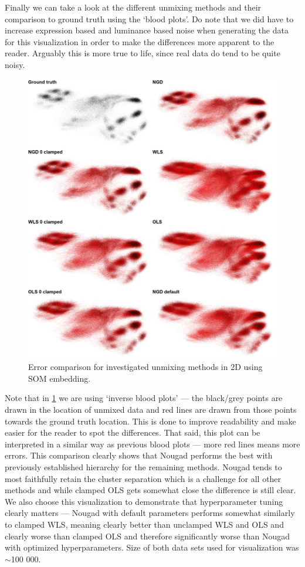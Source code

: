 Finally we can take a look at the different unmixing methods and their comparison to ground truth using the `blood plots'. Do note that we did have to increase expression based and luminance based noise when generating the data for this visualization in order to make the differences more apparent to the reader. Arguably this is more true to life, since real data do tend to be quite noisy. 

\begin{figure}
  \includegraphics[width=1\linewidth]{img/8-way.png}
  \caption{Error comparison for investigated unmixing methods in 2D using SOM embedding.}
  \label{fig:8-way}
\end{figure}

Note that in \cref{fig:8-way} we are using `inverse blood plots' --- the black/grey points are drawn in the location of unmixed data and red lines are drawn from those points towards the ground truth location. This is done to improve readability and make easier for the reader to spot the differences. That said, this plot can be interpreted in a similar way as previous blood plots --- more red lines means more errors. This comparison clearly shows that Nougad performs the best with previously established hierarchy for the remaining methods. Nougad tends to most faithfully retain the cluster separation which is a challenge for all other methods and while clamped OLS gets somewhat close the difference is still clear. We also choose this visualization to demonstrate that hyperparameter tuning clearly matters --- Nougad with default parameters performs somewhat similarly to clamped WLS, meaning clearly better than unclamped WLS and OLS and clearly worse than clamped OLS and therefore significantly worse than Nougad with optimized hyperparameters.
Size of both data sets used for visualization was $\sim$100 000.

